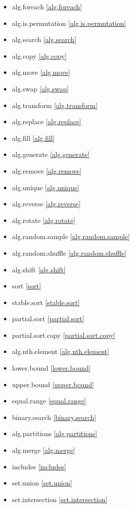 \begin{multicols}{3}
\begin{itemize}
\item{alg.foreach}					\ref{alg.foreach}
\item{alg.is.permutation}			\ref{alg.is.permutation}
\item{alg.search}					\ref{alg.search}
\item{alg.copy}						\ref{alg.copy}
\item{alg.move}						\ref{alg.move}
\item{alg.swap}						\ref{alg.swap}
\item{alg.transform}				\ref{alg.transform}
\item{alg.replace}					\ref{alg.replace}
\item{alg.fill}						\ref{alg.fill}
\item{alg.generate}					\ref{alg.generate}
\item{alg.remove}					\ref{alg.remove}
\item{alg.unique}					\ref{alg.unique}
\item{alg.reverse}					\ref{alg.reverse}
\item{alg.rotate}					\ref{alg.rotate}
\item{alg.random.sample}			\ref{alg.random.sample}
\item{alg.random.shuffle}			\ref{alg.random.shuffle}
\item{alg.shift}					\ref{alg.shift}
\item{sort}							\ref{sort}
\item{stable.sort}					\ref{stable.sort}
\item{partial.sort}					\ref{partial.sort}
\item{partial.sort.copy}			\ref{partial.sort.copy}
\item{alg.nth.element}				\ref{alg.nth.element}
\item{lower.bound}					\ref{lower.bound}
\item{upper.bound}					\ref{upper.bound}
\item{equal.range}					\ref{equal.range}
\item{binary.search}				\ref{binary.search}
\item{alg.partitions}				\ref{alg.partitions}
\item{alg.merge}					\ref{alg.merge}
\item{includes}						\ref{includes}
\item{set.union}					\ref{set.union}
\item{set.intersection}				\ref{set.intersection}

\end{itemize}
\end{multicols}
